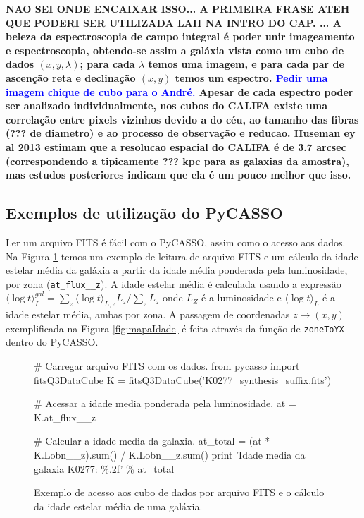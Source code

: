 {\bf \ojo NAO SEI ONDE ENCAIXAR ISSO...  A PRIMEIRA FRASE ATEH QUE PODERI SER UTILIZADA LAH NA INTRO DO CAP. ...
A beleza da espectroscopia de campo integral é poder unir imageamento e espectroscopia, obtendo-se assim a galáxia vista
como um cubo de dados  $(x, y, \lambda)$; para cada $\lambda$ temos uma imagem, e para cada par de ascenção reta e
declinação $(x, y)$ temos um espectro. \ojo \textcolor{blue}{Pedir uma imagem chique de cubo para o André.} Apesar de
cada espectro poder ser analizado individualmente, nos cubos do CALIFA existe uma correlação entre pixels vizinhos
devido a  do céu, ao tamanho das fibras (??? de diametro) e ao processo de observação e reducao.
Huseman ey al 2013 estimam que a resolucao espacial do CALIFA é de 3.7 arcsec (correspondendo a tipicamente ??? kpc para
as galaxias da amostra), mas estudos posteriores indicam que ela é um pouco melhor que isso.}


\subsection{Exemplos de utilização do PyCASSO}

Ler um arquivo FITS é fácil com o PyCASSO, assim como o acesso aos dados. Na Figura \ref{fig:dataAccess} temos um
exemplo de leitura de arquivo FITS e um cálculo da idade estelar média da galáxia a partir da idade média ponderada pela
luminosidade, por zona (\texttt{at\_flux\_\_z}). A idade estelar média é calculada usando a expressão $ \langle \log t
\rangle^{gal}_L = \sum_z \langle \log t \rangle_{L,z} L_z /\sum_z L_z$ onde $L_Z $ é a luminosidade e $ \langle \log t
\rangle_L $ é a idade estelar média, ambas por zona.  A passagem de coordenadas $z \to (x, y)$ exemplificada na Figura
\ref{fig:mapaIdade} é feita através da função de \texttt{zoneToYX} dentro do PyCASSO.

\begin{figure}
\begin{python}
# Carregar arquivo FITS com os dados.
from pycasso import fitsQ3DataCube
K = fitsQ3DataCube('K0277_synthesis_suffix.fits')

# Acessar a idade media ponderada pela luminosidade.
at = K.at_flux__z

# Calcular a idade media da galaxia.
at_total = (at * K.Lobn__z).sum() / K.Lobn__z.sum()
print 'Idade media da galaxia K0277: \%.2f' \% at_total
\end{python}
	\caption[Exemplo de programa utilizando PyCASSO]
	{Exemplo de acesso aos cubo de dados por arquivo FITS e o cálculo da idade
	estelar média de uma galáxia.}
	\label{fig:dataAccess}
\end{figure}


